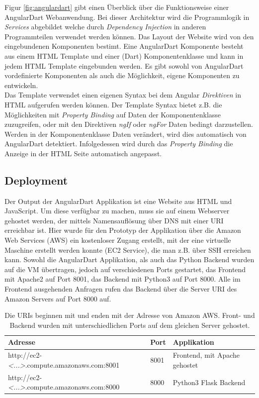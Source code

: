 Figur \ref{fig:angulardart} gibt einen Überblick über die Funktionsweise einer AngularDart Webanwendung. Bei dieser Architektur wird die Programmlogik in \textit{Services} abgebildet welche durch \textit{Dependency Injection} in anderen Programmteilen verwendet werden können. Das Layout der Website wird von den eingebundenen Komponenten bestimt. Eine AngularDart Komponente besteht aus einem HTML Template und einer (Dart) Komponentenklasse und kann in jedem HTML Template eingebunden werden. Es gibt sowohl von AngularDart vordefinierte Komponenten als auch die Möglichkeit, eigene Komponenten zu entwickeln.\\
Das Template verwendet einen eigenen Syntax bei dem Angular \textit{Direktiven} in HTML aufgerufen werden können. Der Template Syntax bietet z.B. die Möglichkeiten mit \textit{Property Binding} auf Daten der Komponentenklasse zuzugreifen, oder mit den Direktiven \textit{ngIf} oder \textit{ngFor} Daten bedingt darzustellen.\\Werden in der Komponentenklasse Daten verändert, wird dies automatisch von AngularDart detektiert. Infolgedessen wird durch das \textit{Property Binding} die Anzeige in der HTML Seite automatisch angepasst.

\subsection{Deployment}
\label{sec:deployment}

Der Output der AngularDart Applikation ist eine Website aus HTML und JavaScript. Um diese verfügbar zu machen, muss sie auf einem Webserver gehostet werden, der mittels Namensauflösung über DNS mit einer URI erreichbar ist. Hier wurde für den Prototyp der Applikation über die Amazon Web Services (AWS) ein kostenloser Zugang erstellt, mit der eine virtuelle Maschine erstellt werden konnte (EC2 Service), die man z.B. über SSH erreichen kann. Sowohl die AngularDart Applikation, als auch das Python Backend wurden auf die VM übertragen, jedoch auf verschiedenen Ports gestartet, das Frontend mit Apache2 auf Port 8001, das Backend mit Python3 auf Port 8000. Alle im Frontend ausgehenden Anfragen rufen das Backend über die Server URI des Amazon Servers auf Port 8000 auf.

\begin{table}[h!]
	\centering
	\begin{tabular}{|l|l|l|}
		\hline
		\textbf{Adresse} & \textbf{Port} & \textbf{Applikation}\\
		\hline
		\hline
		http://ec2-\textit{<...>}.compute.amazonaws.com:8001 & 8001 & Frontend, mit Apache gehostet\\
		\hline
		http://ec2-\textit{<...>}.compute.amazonaws.com:8000 & 8000 & Python3 Flask Backend\\
		\hline
	\end{tabular}
	\caption{Die URIs beginnen mit \textit{} und enden mit der Adresse von Amazon AWS. Front- und Backend wurden mit unterschiedlichen Ports auf dem gleichen Server gehostet.}
\end{table}

